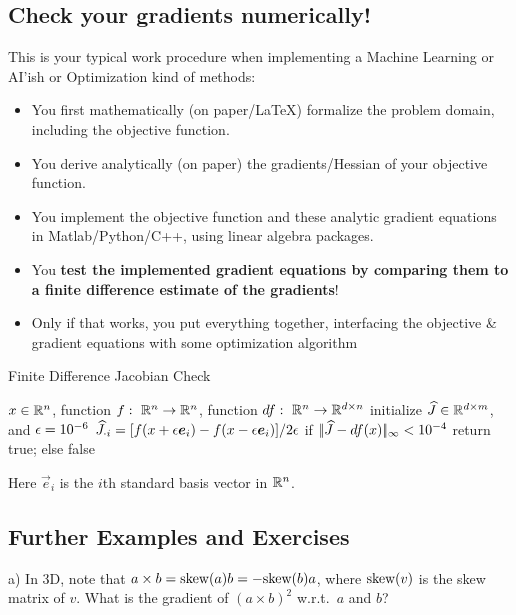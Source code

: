 \subsection{Check your gradients numerically!}

This is your typical work procedure when implementing a Machine
Learning or AI'ish or Optimization kind of methods:
\begin{itemize}
\item You first mathematically (on paper/LaTeX) formalize the problem
domain, including the objective function.
\item You derive analytically (on paper) the gradients/Hessian of your
objective function.
\item You implement the objective function and these analytic gradient
equations in Matlab/Python/C++, using linear algebra packages.
\item You \textbf{test the implemented gradient equations by comparing
them to a finite difference estimate of the gradients}!
\item Only if that works, you put everything together, interfacing the
objective \& gradient equations with some optimization algorithm
\end{itemize}

\begin{algorithm}
\caption{Finite Difference Jacobian Check}
\begin{algorithmic}[1]
\Require $x\in{\mathbb{R}}^n$, function $f:~ {\mathbb{R}}^n \to {\mathbb{R}}^n$, function
$df:~ {\mathbb{R}}^n \to {\mathbb{R}}^{d\times n}$
\State initialize $\widehat J \in {\mathbb{R}}^{d\times m}$, and $\epsilon=10^{-6}$
\State $\widehat J_{\cdot i} =  [f(x + \epsilon \boldsymbol e_i) - f(x - \epsilon \boldsymbol e_i)]/2\epsilon$
\EndFor
\State if $|\!|\widehat J - df(x)|\!|_\infty < 10^{-4}$ return true; else false
\end{algorithmic}
Here $\vec e_i$ is the $i$th standard basis vector in ${\mathbb{R}}^n$.
\end{algorithm}


\subsection{Further Examples and Exercises}


a) In 3D, note that $a \times b = \text{skew}(a) b = - \text{skew}(b) a$, where
$\text{skew}(v)$ is the skew matrix of $v$. What is the gradient of
$(a \times b)^2$ w.r.t.\ $a$ and $b$?

